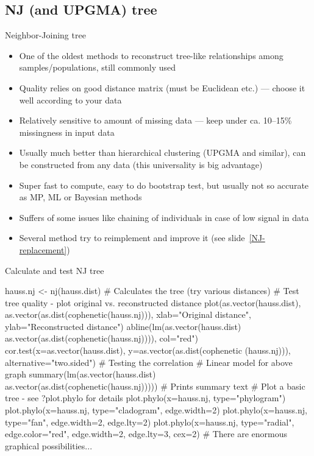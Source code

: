 \documentclass[compress, xelatex, 11pt, xcolor=svgnames, aspectratio=169, url={hyphens, lowtilde}]{beamer}
\begin{document}
\subsection{NJ (and UPGMA) tree}

\begin{frame}{Neighbor-Joining tree}
	\label{NJ}
	\begin{itemize}
		\item One of the oldest methods to reconstruct tree-like relationships among samples/populations, still commonly used
		\item Quality relies on good distance matrix (must be Euclidean etc.) --- choose it well according to your data
		\item Relatively sensitive to amount of missing data --- keep under ca. 10--15\% missingness in input data
		\item Usually much better than hierarchical clustering (UPGMA and similar), can be constructed from any data (this universality is big advantage)
		\item Super fast to compute, easy to do bootstrap test, but usually not so accurate as MP, ML or Bayesian methods
		\item Suffers of some issues like chaining of individuals in case of low signal in data
		\item Several method try to reimplement and improve it (see slide~\ref{NJ-replacement})
	\end{itemize}
\end{frame}

\begin{frame}[fragile]{Calculate and test NJ tree}
	\begin{spluscode}
    hauss.nj <- nj(hauss.dist) # Calculates the tree (try various distances)
    # Test tree quality - plot original vs. reconstructed distance
    plot(as.vector(hauss.dist), as.vector(as.dist(cophenetic(hauss.nj))),
      xlab="Original distance", ylab="Reconstructed distance")
    abline(lm(as.vector(hauss.dist) ~
      as.vector(as.dist(cophenetic(hauss.nj)))), col="red")
    cor.test(x=as.vector(hauss.dist), y=as.vector(as.dist(cophenetic
      (hauss.nj))), alternative="two.sided") # Testing the correlation
    # Linear model for above graph
    summary(lm(as.vector(hauss.dist) ~
      as.vector(as.dist(cophenetic(hauss.nj))))) # Prints summary text
    # Plot a basic tree - see ?plot.phylo for details
    plot.phylo(x=hauss.nj, type="phylogram")
    plot.phylo(x=hauss.nj, type="cladogram", edge.width=2)
    plot.phylo(x=hauss.nj, type="fan", edge.width=2, edge.lty=2)
    plot.phylo(x=hauss.nj, type="radial", edge.color="red", edge.width=2,
      edge.lty=3, cex=2) # There are enormous graphical possibilities...
	\end{spluscode}
\end{frame}
\end{document}
